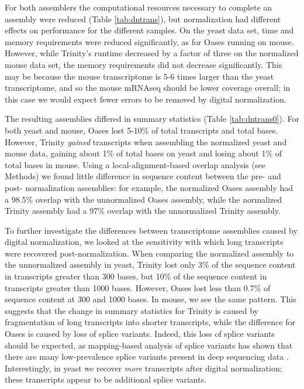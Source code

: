 \documentclass{pnastwo}
\begin{document}
\begin{article}
For both assemblers the computational resources necessary to complete
an assembly were reduced (Table \ref{tab:dntrans}), but normalization
had different effects on performance for the different samples.  On the
yeast data set, time and memory requirements were reduced
significantly, as for Oases running on mouse.  However, while
Trinity's runtime decreased by a factor of three on the normalized
mouse data set, the memory requirements did not decrease
significantly.  This may be because the mouse transcriptome is 5-6
times larger than the yeast transcriptome, and so the mouse mRNAseq
should be lower coverage overall; in this case we would expect fewer
errors to be removed by digital normalization.

The resulting assemblies differed in summary statistics (Table
\ref{tab:dntrans0}).  For both yeast and mouse, Oases lost 5-10\% of
total transcripts and total bases.  However, Trinity {\em gained}
transcripts when assembling the normalized yeast and mouse data,
gaining about 1\% of total bases on yeast and losing about 1\%
of total bases in mouse.  Using a local-alignment-based overlap
analysis (see Methods) we found little difference in sequence
content between the pre- and post- normalization assemblies: for
example, the normalized Oases assembly had a 98.5\% overlap with the
unnormalized Oases assembly, while the normalized Trinity assembly had
a 97\% overlap with the unnormalized Trinity assembly.

To further investigate the differences between transcriptome
assemblies caused by digital normalization, we looked at the
sensitivity with which long transcripts were recovered
post-normalization.  When comparing the normalized assembly to the
unnormalized assembly in yeast, Trinity lost only 3\% of the sequence
content in transcripts greater than 300 bases, but 10\% of the
sequence content in transcripts greater than 1000 bases.  However,
Oases lost less than 0.7\% of sequence content at 300 and
1000 bases.  In mouse, we see the same pattern.
This suggests that the change in summary statistics for
Trinity is caused by fragmentation of long transcripts into shorter
transcripts, while the difference for Oases is caused by loss of
splice variants.  Indeed, this
loss of splice variants should be expected, as mapping-based analysis
of splice variants has shown that there are many low-prevalence splice
variants present in deep sequencing data \cite{pubmed21151575}.
Interestingly, in yeast we recover {\em more} transcripts after
digital normalization; these transcripts appear to be additional splice
variants.


\end{article}
\end{document}
